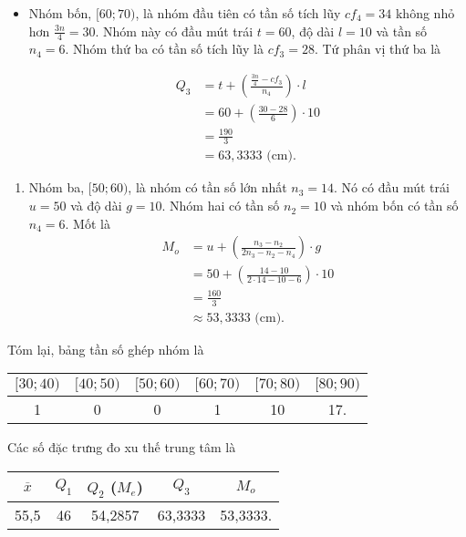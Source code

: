 \documentclass[
  letterpaper,
  DIV=11,
  numbers=noendperiod]{scrartcl}
\providecommand{\tightlist}{%
  \setlength{\itemsep}{0pt}\setlength{\parskip}{0pt}}\usepackage{longtable,booktabs,array}
\begin{document}
\begin{itemize}
\item
  Nhóm bốn, \([60;70)\), là nhóm đầu tiên có tần số tích lũy \(cf_4=34\)
  không nhỏ hơn \(\frac{3n}{4}=30\). Nhóm này có đầu mút trái \(t=60\),
  độ dài \(l=10\) và tần số \(n_4=6\). Nhóm thứ ba có tần số tích lũy là
  \(cf_3=28\). Tứ phân vị thứ ba là

  \begin{align*}
        Q_3
            & = t + \left(\frac{\frac{3n}{4}-cf_3}{n_4}\right)\cdot l \\
            & = 60 + \left(\frac{30-28}{6}\right)\cdot 10 \\
            & = \frac{190}{3} \\
            & = 63,3333 \text{ (cm).}
    \end{align*}
\end{itemize}

\begin{enumerate}
\def\labelenumi{\alph{enumi}.}
\setcounter{enumi}{1}
\tightlist
\item
  Nhóm ba, \([50;60)\), là nhóm có tần số lớn nhất \(n_3=14\). Nó có đầu
  mút trái \(u=50\) và độ dài \(g=10\). Nhóm hai có tần số \(n_2=10\) và
  nhóm bốn có tần số \(n_4=6\). Mốt là \begin{align*}
       M_o
           & = u + \left(\frac{n_3-n_2}{2n_3-n_2-n_4}\right) \cdot g \\
           & = 50 + \left(\frac{14-10}{2\cdot 14-10-6}\right)\cdot 10 \\
           & = \frac{160}{3} \\
           & \approx 53,3333 \text{ (cm)}.
   \end{align*}
\end{enumerate}

Tóm lại, bảng tần số ghép nhóm là

\begin{center}
\begin{tabular}{|c|c|c|c|c|c|}
\hline 
$[30;40)$ & $[40;50)$ & $[50;60)$ & $[60;70)$ & $[70;80)$ & $[80;90)$  \\
\hline 
1 & 0 & 0 & 1 & 10 & 17. \\
\hline
\end{tabular}
\end{center}

Các số đặc trưng đo xu thế trung tâm là

\begin{center}
\begin{tabular}{|c|c|c|c|c|}
\hline
$\overline{x}$ & $Q_1$ & $Q_2$ ($M_e$) & $Q_3$ & $M_o$ \\
\hline
55,5 & 46 & 54,2857 & 63,3333 & 53,3333. \\
\hline 
\end{tabular}
\end{center}
\end{document}
